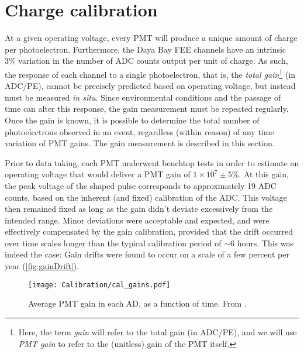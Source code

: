 \documentclass[../thesis.tex]{subfiles}
\begin{document}
\section{Charge calibration}
\label{sec:calibGain}

At a given operating voltage, every PMT will produce a unique amount of charge per photoelectron. Furthermore, the Daya Bay FEE channels have an intrinsic 3\% variation in the number of ADC counts output per unit of charge. As such, the response of each channel to a single photoelectron, that is, the \emph{total gain}\footnote{Here, the term \emph{gain} will refer to the total gain (in ADC/PE), and we will use \emph{PMT gain} to refer to the (unitless) gain of the PMT itself.} (in ADC/PE), cannot be precisely predicted based on operating voltage, but instead must be measured \emph{in situ}. Since environmental conditions and the passage of time can alter this response, the gain measurement must be repeated regularly. Once the gain is known, it is possible to determine the total number of photoelectrons observed in an event, regardless (within reason) of any time variation of PMT gains. The gain measurement is described in this section.

Prior to data taking, each PMT underwent benchtop tests in order to estimate an operating voltage that would deliver a PMT gain of $1 \times 10^7 \pm 5\%$. At this gain, the peak voltage of the shaped pulse corresponds to approximately 19 ADC counts, based on the inherent (and fixed) calibration of the ADC. This voltage then remained fixed as long as the gain didn't deviate excessively from the intended range. Minor deviations were acceptable and expected, and were effectively compensated by the gain calibration, provided that the drift occurred over time scales longer than the typical calibration period of $\sim$6 hours. This was indeed the case: Gain drifts were found to occur on a scale of a few percent per year (\autoref{fig:gainDrift}).

\begin{figure}[h]
  \texttt{[image: Calibration/cal\_gains.pdf]}
  \caption{Average PMT gain in each AD, as a function of time. From \cite{An_2017}.}
  \label{fig:gainDrift}
\end{figure}
\end{document}
